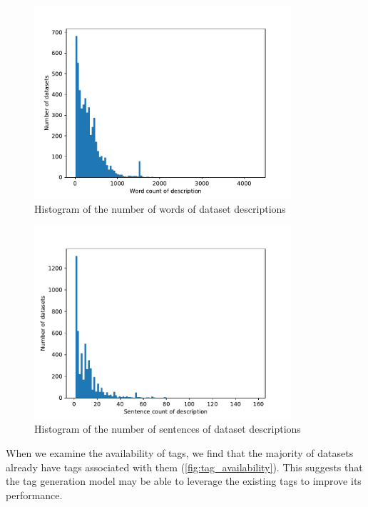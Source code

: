 \begin{figure}[h]
    \centering
    \includegraphics[width=0.85\textwidth]{figures/words_of_descriptions.pdf}
    \caption{Histogram of the number of words of dataset descriptions}
    \label{fig:words_of_descriptions}
\end{figure}

\begin{figure}[h]
    \centering
    \includegraphics[width=0.85\textwidth]{figures/sentences_of_descriptions.pdf}
    \caption{Histogram of the number of sentences of dataset descriptions}
    \label{fig:sentences_of_descriptions}
\end{figure}

When we examine the availability of tags, we find that the majority of datasets already have tags associated with them (\cref{fig:tag_availability}). This suggests that the tag generation model may be able to leverage the existing tags to improve its performance.

